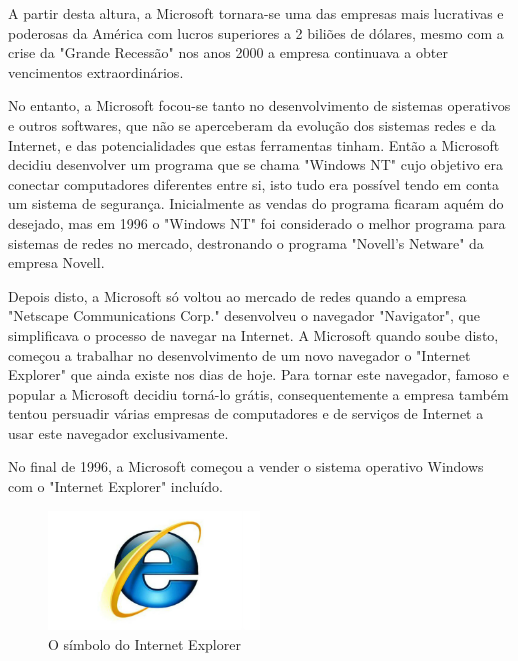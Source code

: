 \documentclass{report}
\begin{document}
A partir desta altura, a Microsoft tornara-se uma das empresas mais lucrativas e poderosas da América com lucros superiores a 2 biliões de dólares, mesmo com a crise da "Grande Recessão" nos anos 2000 a empresa continuava a obter vencimentos extraordinários.

No entanto, a Microsoft focou-se tanto no desenvolvimento de sistemas operativos e outros softwares, que não se aperceberam da evolução dos sistemas redes e da Internet, e das potencialidades que estas ferramentas tinham. Então a Microsoft decidiu desenvolver um programa que se chama "Windows NT" cujo objetivo era conectar computadores diferentes entre si, isto tudo era possível tendo em conta um sistema de segurança. Inicialmente as vendas do programa ficaram aquém do desejado, mas em 1996 o "Windows NT" foi considerado o melhor programa para sistemas de redes no mercado, destronando o programa "Novell's Netware" da empresa Novell.

Depois disto, a Microsoft só voltou ao mercado de redes quando a empresa "Netscape Communications Corp." desenvolveu o navegador "Navigator", que simplificava o processo de navegar na Internet. A Microsoft quando soube disto, começou a trabalhar no desenvolvimento de um novo navegador o "Internet Explorer" que ainda existe nos dias de hoje. Para tornar este navegador, famoso e popular a Microsoft decidiu torná-lo grátis, consequentemente a empresa também tentou persuadir várias empresas de computadores e de serviços de Internet a usar este navegador exclusivamente.

No final de 1996, a Microsoft começou a vender o sistema operativo Windows com o "Internet Explorer" incluído.

\vspace{5mm}

\begin{figure}[h!]
\includegraphics[width=0.5\textwidth]{Internet-Explorer-logo.jpg}
\centering
\caption{O símbolo do Internet Explorer}
\end{figure}

\vspace{5mm}
\end{document}
